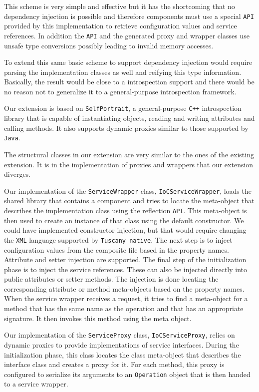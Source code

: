 This scheme is very simple and effective but it has the shortcoming that no dependency injection is possible and
therefore components must use a special \texttt{API} provided by this implementation to retrieve configuration values and
service references. In addition the \texttt{API} and the generated proxy and wrapper classes use unsafe type conversions
possibly leading to invalid memory accesses.

To extend this same basic scheme to support dependency injection would require parsing the implementation classes
as well and reifying this type information. Basically, the result would be close to a introspection support
and there would be no reason not to generalize it to a general-purpose introspection framework.

Our extension is based on \texttt{SelfPortrait}, a general-purpose \texttt{C++} introspection library that is capable
of instantiating objects, reading and writing attributes and calling methods. It also supports dynamic proxies
similar to those supported by \texttt{Java}.

The structural classes in our extension are very similar to the ones of the existing extension. It is in the
implementation of proxies and wrappers that our extension diverges.

Our implementation of the \texttt{ServiceWrapper} class, \texttt{IoCServiceWrapper}, loads the shared library
that contains a component and tries to locate the meta-object that describes the implementation class using
the reflection \texttt{API}. This meta-object is then used to create an instance of that class using the default constructor.
We could have implemented constructor injection, but that would require changing the \texttt{XML} language supported by
\texttt{Tuscany native}. The next step is to inject configuration values from the composite file based in the property names.
Attribute and setter injection are supported. The final step of the initialization phase is to inject the service
references. These can also be injected directly into public attributes or setter methods. The injection is done
locating the corresponding attribute or method meta-objects based on the property names. When the service wrapper
receives a request, it tries to find a meta-object for a method that has the same name as the operation and that
has an appropriate signature. It then invokes this method using the meta object.

Our implementation of the \texttt{ServiceProxy} class, \texttt{IoCServiceProxy}, relies on dynamic proxies to provide
implementations of service interfaces. During the initialization phase, this class locates the class meta-object that
describes the interface class and creates a proxy for it. For each method, this proxy is configured to serialize its
arguments to an \texttt{Operation} object that is then handed to a service wrapper.

